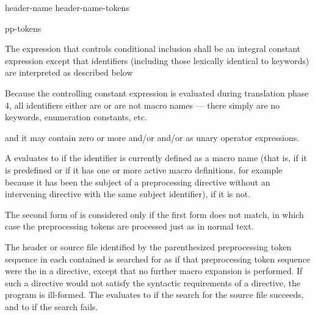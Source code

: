 %
\begin{bnf}
\br
     \terminal{(} header-name \terminal{)}\br
     \terminal{(} header-name-tokens \terminal{)}
\end{bnf}

%
\begin{bnf}
\br
     pp-tokens \terminal{)}
\end{bnf}

\pnum
The expression that controls conditional inclusion
shall be an integral constant expression except that
identifiers
(including those lexically identical to keywords)
are interpreted as described below
\begin{footnote}
Because the controlling constant expression is evaluated
during translation phase 4,
all identifiers either are or are not macro names ---
there simply are no keywords, enumeration constants, etc.
\end{footnote}
and it may contain zero or more  and/or
 and/or
 as unary operator expressions.

\pnum
A  evaluates to 
if the identifier is currently defined
as a macro name
(that is, if it is predefined
or if it has one or more active macro definitions,
for example because
it has been the subject of a
preprocessing directive
without an intervening
directive with the same subject identifier),  if it is not.

\pnum
The second form of 
is considered only if the first form does not match,
in which case the preprocessing tokens are processed just as in normal text.

\pnum
The header or source file identified by
the parenthesized preprocessing token sequence
in each contained 
is searched for as if that preprocessing token sequence
were the  in a  directive,
except that no further macro expansion is performed.
If such a directive would not satisfy the syntactic requirements
of a  directive, the program is ill-formed.
The  evaluates
to  if the search for the source file succeeds, and
to  if the search fails.

